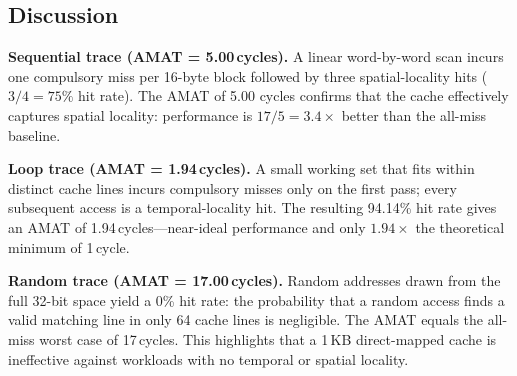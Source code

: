 \documentclass[conference]{IEEEtran}
\renewcommand{\_}{\textunderscore\allowbreak{}}
\begin{document}
\begin{table}[!t]
  \centering
  \caption{Measured hit/miss rates and computed AMAT for all four traces
           ($t_{\mathrm{hit}} = 1$ cycle, $t_{\mathrm{penalty}} = 16$ cycles)}
  \label{tab:amat}
  \renewcommand{\arraystretch}{1.4}
\end{table}

\subsection{Discussion}

\textbf{Sequential trace (AMAT = 5.00\,cycles).}
A linear word-by-word scan incurs one compulsory miss per 16-byte block
followed by three spatial-locality hits ($3/4 = 75\%$ hit rate). The
AMAT of 5.00 cycles confirms that the cache effectively captures
spatial locality: performance is $17/5 = 3.4\times$ better than the
all-miss baseline.

\textbf{Loop trace (AMAT = 1.94\,cycles).}
A small working set that fits within distinct cache lines incurs
compulsory misses only on the first pass; every subsequent access is a
temporal-locality hit. The resulting 94.14\% hit rate gives an AMAT of
1.94\,cycles---near-ideal performance and only $1.94\times$ the
theoretical minimum of 1\,cycle.

\textbf{Random trace (AMAT = 17.00\,cycles).}
Random addresses drawn from the full 32-bit space yield a 0\% hit rate:
the probability that a random access finds a valid matching line in
only 64 cache lines is negligible. The AMAT equals the all-miss
worst case of 17\,cycles. This highlights that a 1\,KB direct-mapped
cache is ineffective against workloads with no temporal or spatial
locality.
\end{document}
